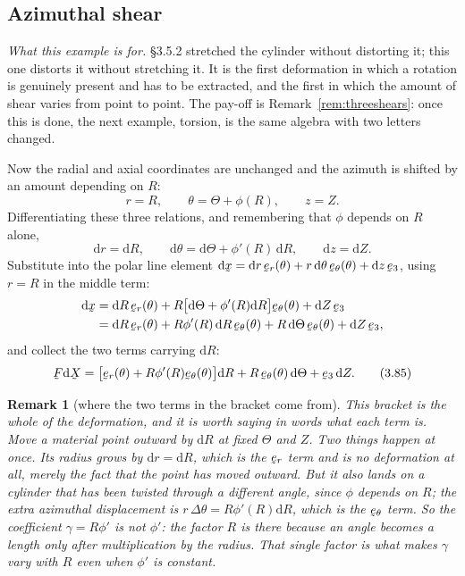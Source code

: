 \documentclass[17pt,a4paper]{extreport}
\DeclareRobustCommand{\vek}[1]{\underaccent{\tilde}{#1}}
\newcommand{\bx}{\vek{x}}
\newcommand{\bX}{\vek{X}}
\newcommand{\bF}{\vek{F}}
\newcommand{\be}{\vek{e}}
\newcommand{\ber}{\vek{e}_{r}}
\newcommand{\bet}{\vek{e}_{\theta}}
\newcommand{\dl}{\mathrm{d}}
\theoremstyle{scplain}
\theoremstyle{scdefn}
\newtheorem{remark}[theorem]{Remark}
\begin{document}
\subsection{Azimuthal shear}\label{sec:azim}

\emph{What this example is for.} \S3.5.2 stretched the cylinder without
distorting it; this one distorts it without stretching it. It is the first
deformation in which a rotation is genuinely present and has to be
extracted, and the first in which the amount of shear varies from point to
point. The pay-off is Remark~\ref{rem:threeshears}: once this is done, the
next example, torsion, is the same algebra with two letters changed.

Now the radial and axial coordinates are unchanged and the azimuth is
shifted by an amount depending on $R$:
\begin{equation}
   r=R,\qquad \theta=\Theta+\phi(R),\qquad z=Z .
   \tag{3.84}\label{eq:3.84}
\end{equation}
Differentiating these three relations, and remembering that $\phi$ depends
on $R$ alone,
\[
   \dl r=\dl R,\qquad
   \dl\theta=\dl\Theta+\phi'(R)\,\dl R,\qquad
   \dl z=\dl Z .
\]
Substitute into the polar line element
$\dl\bx=\dl r\,\ber(\theta)+r\,\dl\theta\,\bet(\theta)+\dl z\,\be_{3}$,
using $r=R$ in the middle term:
\[
\begin{aligned}
   \dl\bx&=\dl R\,\ber(\theta)
      +R\big[\dl\Theta+\phi'(R)\dl R\big]\bet(\theta)+\dl Z\,\be_{3}\\
   &=\dl R\,\ber(\theta)+R\phi'(R)\,\dl R\,\bet(\theta)
      +R\,\dl\Theta\,\bet(\theta)+\dl Z\,\be_{3},
\end{aligned}
\]
and collect the two terms carrying $\dl R$:
\begin{equation}
   \bF\dl\bX=\big[\ber(\theta)+R\phi'(R)\bet(\theta)\big]\dl R
             +R\,\bet(\theta)\,\dl\Theta+\be_{3}\,\dl Z .
   \tag{3.85}\label{eq:3.85}
\end{equation}

\begin{remark}[where the two terms in the bracket come from]
\label{rem:twoterms}
This bracket is the whole of the deformation, and it is worth saying in
words what each term is. Move a material point outward by $\dl R$ at fixed
$\Theta$ and $Z$. Two things happen at once. Its radius grows by
$\dl r=\dl R$, which is the $\ber$ term and is no deformation at all,
merely the fact that the point has moved outward. But it also lands on a
cylinder that has been twisted through a \emph{different} angle, since
$\phi$ depends on $R$; the extra azimuthal displacement is
$r\,\Delta\theta=R\phi'(R)\dl R$, which is the $\bet$ term. So the
coefficient $\gamma=R\phi'$ is not $\phi'$: the factor $R$ is there
because an angle becomes a length only after multiplication by the radius.
That single factor is what makes $\gamma$ vary with $R$ even when
$\phi'$ is constant.
\end{remark}
\end{document}
